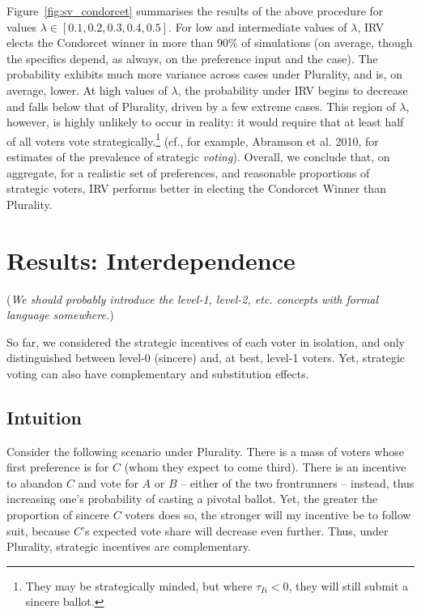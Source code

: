 \documentclass[12pt, letter]{article}
\begin{document}
Figure~\ref{fig:sv_condorcet} summarises the results of the above procedure for values $\lambda \in [0.1, 0.2, 0.3, 0.4, 0.5]$. For low and intermediate values of $\lambda$, IRV elects the Condorcet winner in more than 90\% of simulations (on average, though the specifics depend, as always, on the preference input and the case). The probability exhibits much more variance across cases under Plurality, and is, on average, lower. At high values of $\lambda$, the probability under IRV begins to decrease and falls below that of Plurality, driven by a few extreme cases. This region of $\lambda$, however, is highly unlikely to occur in reality: it would require that at least half of all voters vote strategically.\footnote{They may be strategically minded, but where $\tau_{Ii} < 0$, they will still submit a sincere ballot.} (cf., for example, Abramson et al. 2010, for estimates of the prevalence of strategic \emph{voting}). 
Overall, we conclude that, on aggregate, for a realistic set of preferences, and reasonable proportions of strategic voters, IRV performs better in electing the Condorcet Winner than Plurality.

\section{Results: Interdependence}

(\emph{We should probably introduce the level-1, level-2, etc. concepts with formal language somewhere.})

So far, we considered the strategic incentives of each voter in isolation, and only distinguished between level-0 (sincere) and, at best, level-1 voters. Yet, strategic voting can also have complementary and substitution effects. 

\subsection{Intuition}

Consider the following scenario under Plurality. There is a mass of voters whose first preference is for $C$ (whom they expect to come third). There is an incentive to abandon $C$ and vote for $A$ or $B$ -- either of the two frontrunners -- instead, thus increasing one's probability of casting a pivotal ballot. Yet, the greater the proportion of sincere $C$ voters does so, the stronger will my incentive be to follow suit, because $C$'s expected vote share will decrease even further. Thus, under Plurality, strategic incentives are complementary. 
\end{document}
